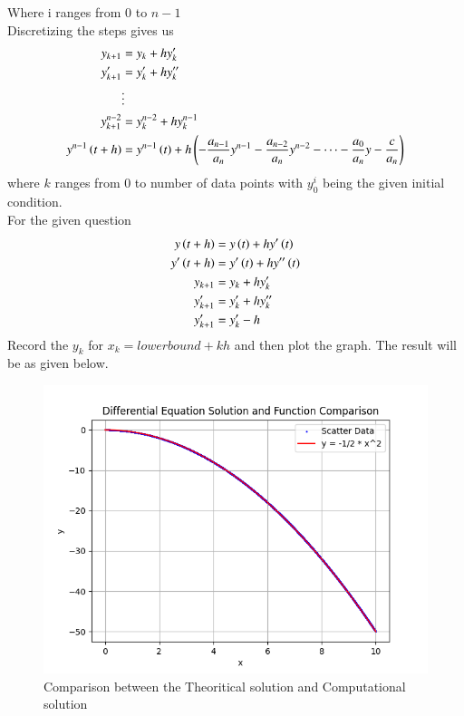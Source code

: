 \documentclass[journal]{IEEEtran}
\begin{document}
Where i ranges from 0 to $n-1$\\
Discretizing the steps gives us
\begin{align}
	y_{k+1} &= y_k + hy^{\prime}_k\\
	y^{\prime}_{k+1} &= y^{\prime}_k + hy^{\prime\prime}_k\\
	&\vdots\\
	y^{n-2}_{k+1} &= y^{n-2}_{k} + hy^{n-1}_{k}\\
	y^{n-1}\left(t+h\right) &= y^{n-1}\left(t\right) + h\left(-\frac{a_{n-1}}{a_n}y^{n-1}-\frac{a_{n-2}}{a_n}y^{n-2} - \dots -\frac{a_{0}}{a_n}y - \frac{c}{a_n}\right)
\end{align}
where $k$ ranges from 0 to number of data points with $y^{i}_0$ being the given initial condition.\\
For the given question\\
\begin{align}
	y\left(t+h\right) &= y\left(t\right) + hy^{\prime}\left(t\right)\\
	y^{\prime}\left(t+h\right) &= y^{\prime}\left(t\right) + hy^{\prime\prime}\left(t\right)\\
	y_{k+1} &= y_k + hy^{\prime}_k\\
	y^{\prime}_{k+1} &= y^{\prime}_k + hy^{\prime\prime}_k\\
	y^{\prime}_{k+1} &= y^{\prime}_k - h
\end{align}
Record the $y_k$ for $x_k =lowerbound+kh$ and then plot the graph. The result will be as given below.
\begin{figure}[h!]
   \centering
   \includegraphics[width=1\linewidth]{figs/fig.png}
   \caption{Comparison between the Theoritical solution and Computational solution}
   \label{stemplot}
\end{figure}
\end{document}

